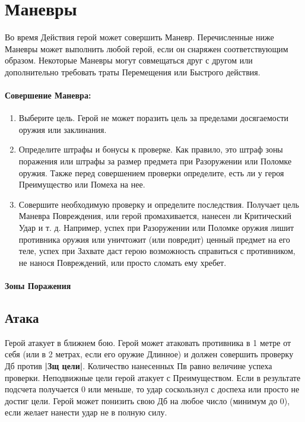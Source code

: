 \section{Маневры}
Во время Действия герой может совершить Маневр. Перечисленные ниже Маневры может выполнить любой герой, если он снаряжен соответствующим образом. Некоторые Маневры могут совмещаться друг с другом или дополнительно требовать траты Перемещения или Быстрого действия.
\paragraph{Совершение Маневра:}
\begin{enumerate}
\item Выберите цель. Герой не может поразить цель за пределами досягаемости оружия или заклинания.
\item Определите штрафы и бонусы к проверке. Как правило, это штраф зоны поражения или штрафы за размер предмета при Разоружении или Поломке оружия. Также перед совершением проверки определите, есть ли у героя Преимущество или Помеха на нее.
\item Совершите необходимую проверку и определите последствия. Получает цель Маневра Повреждения, или герой промахивается, нанесен ли Критический Удар и т. д. Например, успех при Разоружении или Поломке оружия лишит противника оружия или уничтожит (или повредит) ценный предмет на его теле, успех при Захвате даст герою возможность справиться с противником, не нанося Повреждений, или просто сломать ему хребет.
\end{enumerate}
\paragraph{Зоны Поражения}
\subsection{Атака}
Герой атакует в ближнем бою. Герой может атаковать противника в 1 метре от себя (или в 2 метрах, если его оружие Длинное) и должен совершить проверку Дб против \textbf{|Зщ цели|}. Количество нанесенных Пв равно величине успеха проверки. Неподвижные цели герой атакует с Преимуществом. Если в результате подсчета получается 0 или меньше, то удар соскользнул с доспеха или просто не достиг цели. Герой может понизить свою Дб на любое число (минимум до 0), если желает нанести удар не в полную силу.
